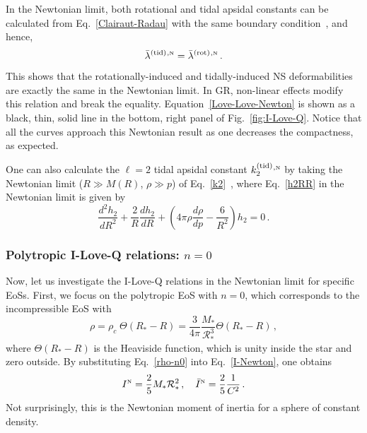 \documentclass[aps,twocolumn,nofootinbib,showpacs,superscriptaddress,hyperref]{revtex4-1}
\newcommand\be{\begin{equation}}
\newcommand\ee{\end{equation}}
\newcommand{\NS}{*}
\newcommand{\RNS}{\mathcal{R}_*}
\newcommand{\tid}{\mathrm{(tid)}}
\newcommand{\rot}{\mathrm{(rot)}}
\newcommand{\N}{{\mbox{\tiny N}}}
\begin{document}
In the Newtonian limit, both rotational and tidal apsidal constants can be calculated from Eq.~\eqref{Clairaut-Radau} with the same boundary condition~\cite{mora-will}, and hence, 
%
\be
\bar{\lambda}^\tid{}^{,\N} = \bar{\lambda}^\rot{}^{,\N}\,.
\label{Love-Love-Newton}
\ee
% 
This shows that the rotationally-induced and tidally-induced NS deformabilities are exactly the same in the Newtonian limit. In GR, non-linear effects modify this relation and break the equality. Equation~\eqref{Love-Love-Newton} is shown as a black, thin, solid line in the bottom, right panel of Fig.~\ref{fig:I-Love-Q}. Notice that all the curves approach this Newtonian result as one decreases the compactness, as expected. 

One can also calculate the $\ell=2$ tidal apsidal constant $k_2^\tid{}^{,\N}$ by taking the Newtonian limit ($R \gg M(R)$, $\rho \gg p$) of Eq.~\eqref{k2}~\cite{hinderer-love}, where Eq.~\eqref{h2RR} in the Newtonian limit is given by
%
\be
\frac{d^2 h_2}{dR^2} + \frac{2}{R} \frac{d h_2}{dR} + \left( 4 \pi \rho \frac{d\rho}{dp} - \frac{6}{R^2} \right)h_2 =0\,.
\label{h2RR-Newton}
\ee
%

\subsubsection{Polytropic I-Love-Q relations: $n=0$}

Now, let us investigate the I-Love-Q relations in the Newtonian limit for specific EoSs. First, we focus on the polytropic EoS with $n=0$, which corresponds to the incompressible EoS with 
%
\be
\rho = \rho_c \; \Theta(R_{\NS} - R)= \frac{3}{4\pi} \frac{M_\NS}{\RNS^3} \Theta(R_{\NS} - R)\,, 
\label{rho-n0}
\ee
%
where $\Theta(R _{\NS}- R)$ is the Heaviside function, which is unity inside the star
and zero outside. By substituting Eq.~\eqref{rho-n0} into Eq.~\eqref{I-Newton}, one obtains
%
\be
I^\N = \frac{2}{5} M_\NS \RNS^2\,, \quad \bar{I}^\N = \frac{2}{5} \frac{1}{C^2}\,.
\label{I-bar-n0}
\ee
%
Not surprisingly, this is the Newtonian moment of inertia for a sphere of constant density. 
\end{document}
